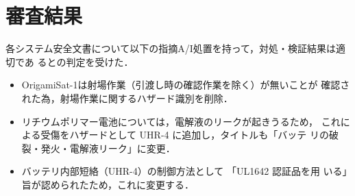 \section{審査結果}
各システム安全文書について以下の指摘A/I処置を持って，対処・検証結果は適切であ
るとの判定を受けた．

\begin{itemize}
  \item OrigamiSat-1は射場作業（引渡し時の確認作業を除く）が無いことが
    確認された為，射場作業に関するハザード識別を削除．
  \item リチウムポリマー電池については，電解液のリークが起きうるため，
    これによる受傷をハザードとして UHR-4 に追加し，タイトルも「バッテ
      リの破裂・発火・電解液リーク」に変更．
    \item バッテリ内部短絡（UHR-4）の制御方法として 「UL1642 認証品を用
      いる」旨が認められたため，これに変更する．
\end{itemize}

